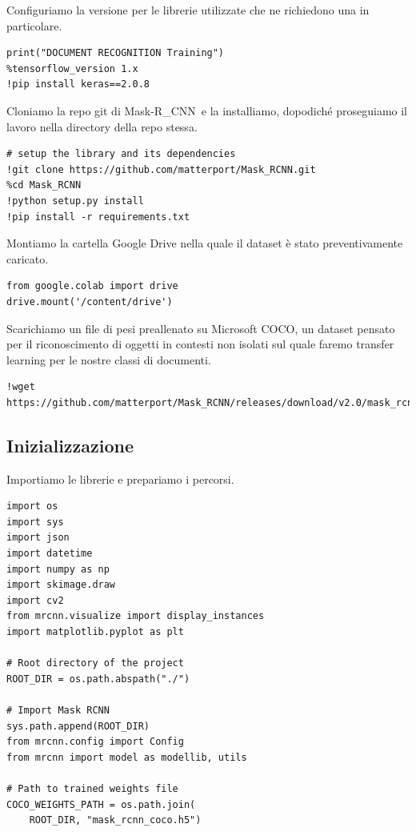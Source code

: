 \documentclass[12pt,a4paper]{article}
\newcommand{\mrcnn}{Mask-R\_CNN}
\begin{document}
Configuriamo la versione per le librerie utilizzate che ne richiedono
una in particolare.

\begin{verbatim}
print("DOCUMENT RECOGNITION Training")
%tensorflow_version 1.x
!pip install keras==2.0.8
\end{verbatim}

Cloniamo la repo git di \mrcnn\ e la installiamo, dopodiché proseguiamo
il lavoro nella directory della repo stessa.

\begin{verbatim}
# setup the library and its dependencies
!git clone https://github.com/matterport/Mask_RCNN.git
%cd Mask_RCNN
!python setup.py install
!pip install -r requirements.txt
\end{verbatim}

Montiamo la cartella Google Drive nella quale il dataset è stato
preventivamente caricato.

\begin{verbatim}
from google.colab import drive
drive.mount('/content/drive')
\end{verbatim}

Scarichiamo un file di pesi preallenato su Microsoft COCO, un dataset
pensato per il riconoscimento di oggetti in contesti non isolati sul
quale faremo transfer learning per le nostre classi di documenti.

\begin{verbatim}
!wget https://github.com/matterport/Mask_RCNN/releases/download/v2.0/mask_rcnn_coco.h5
\end{verbatim}

\subsection{Inizializzazione}

Importiamo le librerie e prepariamo i percorsi.

\begin{verbatim}
import os
import sys
import json
import datetime
import numpy as np
import skimage.draw
import cv2
from mrcnn.visualize import display_instances
import matplotlib.pyplot as plt

# Root directory of the project
ROOT_DIR = os.path.abspath("./")

# Import Mask RCNN
sys.path.append(ROOT_DIR)
from mrcnn.config import Config
from mrcnn import model as modellib, utils

# Path to trained weights file
COCO_WEIGHTS_PATH = os.path.join(
    ROOT_DIR, "mask_rcnn_coco.h5")
\end{verbatim}
\end{document}
